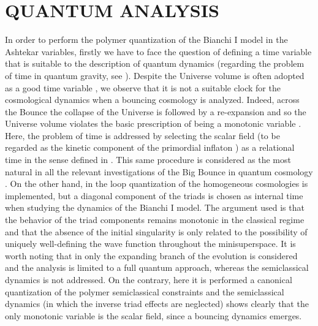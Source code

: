 \documentclass[aps,prd,twocolumn,nofootinbib,superscriptaddress]{revtex4-2}
\begin{document}
\section{QUANTUM ANALYSIS\label{quant}} 	
In order to perform the polymer quantization of the Bianchi I model in the Ashtekar variables, firstly we have to face the question of defining a time variable that is suitable to the description of quantum dynamics (regarding the problem of time in quantum gravity, see \cite{Kuchar,Isham1993}). Despite the Universe volume is often adopted as a good time variable \cite{G,PC,2008}, we observe that it is not a suitable clock for the cosmological dynamics when a bouncing cosmology is analyzed. Indeed, across the Bounce the collapse of the Universe is followed by a re-expansion and so the Universe volume violates the basic prescription of being a monotonic variable \cite{Isham1993,CQG}. Here, the problem of time is addressed by selecting the scalar field (to be regarded as the kinetic component of the primordial inflaton \cite{2002,2010}) as a relational time in the sense defined in \cite{Rovelli}. This same procedure is considered as the most natural in all the relevant investigations of the Big Bounce in quantum cosmology \cite{Review,Ashtekar2011}. On the other hand, in \cite{Bquantum} the loop quantization of the homogeneous cosmologies is implemented, but a diagonal component of the triads is chosen as internal time when studying the dynamics of the Bianchi I model. The argument used is that the behavior of the triad components remains monotonic in the classical regime and that the absence of the initial singularity is only related to the possibility of uniquely well-defining the wave function throughout the minisuperspace. It is worth noting that in \cite{Bquantum} only the expanding branch of the evolution is considered and the analysis is limited to a full quantum approach, whereas the semiclassical dynamics is not addressed. On the contrary, here it is performed a canonical quantization of the polymer semiclassical constraints and the semiclassical dynamics (in which the inverse triad effects are neglected) shows clearly that the only monotonic variable is the scalar field, since a bouncing dynamics emerges.
\end{document}
